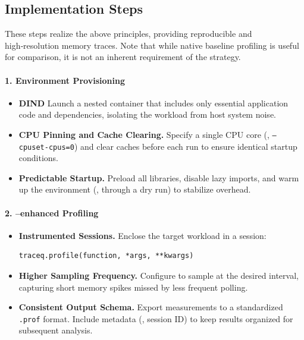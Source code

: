 \subsection{Implementation Steps}
\label{subsec:implementation-steps}

These steps realize the above principles, providing reproducible and high‑resolution memory traces.
Note that while native baseline profiling is useful for comparison, it is not an inherent requirement of the strategy.

\paragraph{1. Environment Provisioning}
\begin{itemize}
    \item \textbf{\ac{DIND}} Launch a nested container that includes only essential application code and dependencies, isolating the workload from host system noise.
    \item \textbf{\ac{CPU} Pinning and Cache Clearing.} Specify a single \ac{CPU} core (\eg, \texttt{--cpuset-cpus=0}) and clear caches before each run to ensure identical startup conditions.
    \item \textbf{Predictable Startup.} Preload all libraries, disable lazy imports, and warm up the environment (\eg, through a dry run) to stabilize overhead.
\end{itemize}

\paragraph{2. \traceq–enhanced Profiling}
\begin{itemize}
    \item \textbf{Instrumented Sessions.} Enclose the target workload in a \traceq session:
    \begin{verbatim}
traceq.profile(function, *args, **kwargs)
    \end{verbatim}
    \item \textbf{Higher Sampling Frequency.} Configure \traceq to sample at the desired interval, capturing short memory spikes missed by less frequent polling.
    \item \textbf{Consistent Output Schema.} Export measurements to a standardized \texttt{.prof} format. Include metadata (\eg, session ID) to keep results organized for subsequent analysis.
\end{itemize}

